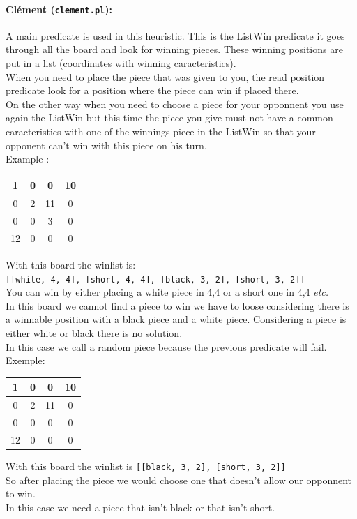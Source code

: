 \documentclass[a4paper,11pt]{article}
\newcommand{\tw}[1]{\texttt{#1}}
\newcommand{\board}[4]{
	\begin{center}
		\begin{tabular}{|c|c|c|c|} \hline
			#1 \\\hline
			#2 \\\hline
			#3 \\\hline
			#4 \\\hline
		\end{tabular}
	\end{center}
}
\begin{document}
		\paragraph{Clément (\tw{clement.pl}):} A main predicate is used in this heuristic. This is the ListWin predicate it goes through all the board and look for winning pieces. These winning positions are put in a list (coordinates with winning caracteristics). \\
		When you need to place the piece that was given to you, the read position predicate look for a position where the piece can win if placed there. \\
		On the other way when you need to choose a piece for your opponnent you use again the ListWin but this time the piece you give must not have a common caracteristics with one of the winnings piece in the ListWin so that your opponent can't win with this piece on his turn. \\
		Example :
		\board{1 & 0 & 0 & 10}{0 & 2 & 11 & 0}{0 & 0 & 3 & 0}{12 & 0 & 0 & 0}
		With this board the winlist is:\\
		\tw{[[white, 4, 4], [short, 4, 4], [black, 3, 2], [short, 3, 2]]} \\
		You can win by either placing a white piece in 4,4 or a short one in 4,4 \textit{etc.}\\
		In this board we cannot find a piece to win we have to loose considering there is a winnable position with a black piece and a white piece. Considering a piece is either white or black there is no solution. \\
		In this case we call a random piece because the previous predicate will fail. \\
		Exemple: \board{1 & 0 & 0 & 10}{0 & 2 & 11 & 0}{0 & 0 & 0 & 0}{12 & 0 & 0 & 0}
		With this board the winlist is \tw{[[black, 3, 2], [short, 3, 2]]} \\
		So after placing the piece we would choose one that doesn't allow our opponnent to win. \\
		In this case we need a piece that isn't black or that isn't short.
		
\end{document}
